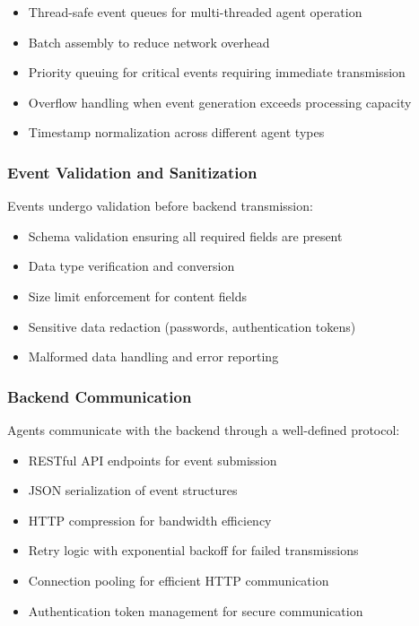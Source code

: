 \begin{itemize}
    \item Thread-safe event queues for multi-threaded agent operation
    \item Batch assembly to reduce network overhead
    \item Priority queuing for critical events requiring immediate transmission
    \item Overflow handling when event generation exceeds processing capacity
    \item Timestamp normalization across different agent types
\end{itemize}

\subsubsection{Event Validation and Sanitization}

Events undergo validation before backend transmission:

\begin{itemize}
    \item Schema validation ensuring all required fields are present
    \item Data type verification and conversion
    \item Size limit enforcement for content fields
    \item Sensitive data redaction (passwords, authentication tokens)
    \item Malformed data handling and error reporting
\end{itemize}

\subsubsection{Backend Communication}

Agents communicate with the backend through a well-defined protocol:

\begin{itemize}
    \item RESTful API endpoints for event submission
    \item JSON serialization of event structures
    \item HTTP compression for bandwidth efficiency
    \item Retry logic with exponential backoff for failed transmissions
    \item Connection pooling for efficient HTTP communication
    \item Authentication token management for secure communication
\end{itemize}

